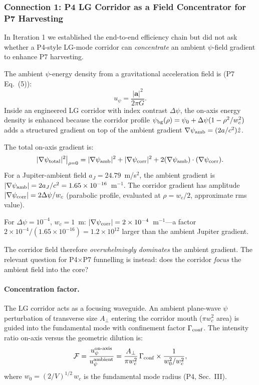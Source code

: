 \documentclass[aps,prd,twocolumn,superscriptaddress,nofootinbib]{revtex4-2}
\begin{document}
\subsubsection{Connection 1: P4 LG Corridor as a Field Concentrator for P7
Harvesting}

In Iteration 1 we established the end-to-end efficiency chain but did not
ask whether a P4-style LG-mode corridor can \emph{concentrate} an ambient
$\psi$-field gradient to enhance P7 harvesting.

The ambient $\psi$-energy density from a gravitational acceleration field is
(P7 Eq.~(5)):
\begin{equation}
u_\psi = \frac{|\mathbf{a}|^2}{2\pi G}.
\label{eq:upsi-ambient}
\end{equation}
Inside an engineered LG corridor with index contrast $\Delta\psi$, the
on-axis energy density is enhanced because the corridor profile
$\psi_{\rm bg}(\rho) = \psi_0 + \Delta\psi(1 - \rho^2/w_c^2)$ adds a
structured gradient on top of the ambient gradient
$\nabla\psi_{\rm amb} = (2a/c^2)\hat{z}$.

The total on-axis gradient is:
\begin{equation}
|\nabla\psi_{\rm total}|^2\big|_{\rho=0}
= |\nabla\psi_{\rm amb}|^2 + |\nabla\psi_{\rm corr}|^2
+ 2(\nabla\psi_{\rm amb})\cdot(\nabla\psi_{\rm corr}).
\end{equation}
For a Jupiter-ambient field $a_J = 24.79$~m/s$^2$, the ambient gradient is
$|\nabla\psi_{\rm amb}| = 2a_J/c^2 = 1.65 \times 10^{-16}$~m$^{-1}$.
The corridor gradient has amplitude $|\nabla\psi_{\rm corr}| = 2\Delta\psi/w_c$
(parabolic profile, evaluated at $\rho = w_c/2$, approximate rms value).

For $\Delta\psi = 10^{-4}$, $w_c = 1$~m:
$|\nabla\psi_{\rm corr}| = 2 \times 10^{-4}$~m$^{-1}$---a factor
$2\times 10^{-4}/(1.65\times 10^{-16}) = 1.2 \times 10^{12}$ larger than the
ambient Jupiter gradient.

The corridor field therefore \emph{overwhelmingly dominates} the ambient
gradient.  The relevant question for P4$\times$P7 funnelling is instead:
does the corridor \emph{focus} the ambient field into the core?

\paragraph{Concentration factor.}
The LG corridor acts as a focusing waveguide.  An ambient plane-wave $\psi$
perturbation of transverse size $A_\perp$ entering the corridor mouth
($\pi w_c^2$ area) is guided into the fundamental mode with confinement
factor $\Gamma_{\rm conf}$.  The intensity ratio on-axis versus the
geometric dilution is:
\begin{equation}
\mathcal{F} = \frac{u_\psi^{\rm on\text{-}axis}}{u_\psi^{\rm ambient}}
= \frac{A_\perp}{\pi w_c^2}\,\Gamma_{\rm conf}
\times \frac{1}{w_0^2/w_c^2},
\end{equation}
where $w_0 = (2/V)^{1/2}\,w_c$ is the fundamental mode radius (P4, Sec.~III).
\end{document}
